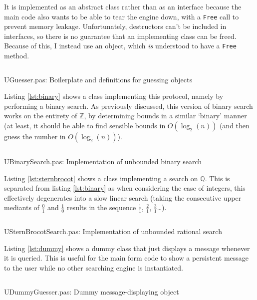 \documentclass[a4paper,11pt]{article}
\newenvironment{longlisting}
{\addvspace{\baselineskip}\captionsetup{type=listing}}
{\addvspace{\baselineskip}}
\begin{document}
    It is implemented as an abstract class rather than as an interface because
    the main code also wants to be able to tear the engine down, with a
    \texttt{Free} call to prevent memory leakage. Unfortunately, destructors
    can't be included in interfaces, so there is no guarantee that an
    implementing class can be freed. Because of this, I instead use an object,
    which \textit{is} understood to have a \texttt{Free} method.

\begin{longlisting}
\inputminted{Pascal}{../UGuesser.pas}
\caption{UGuesser.pas: Boilerplate and definitions for guessing objects}
\label{lst:guesser}
\end{longlisting}

    Listing \ref{lst:binary} shows a class implementing this protocol, namely by
    performing a binary search. As previously discussed, this version of binary
    search works on the entirety of $\mathbb{Z}$, by determining bounds in a
    similar `binary' manner (at least, it should be able to find sensible bounds
    in $O(\log_2(n))$ (and then guess the number in $O(\log_2(n))$).

\begin{longlisting}
\inputminted{Pascal}{../UBinarySearch.pas}
\caption{UBinarySearch.pas: Implementation of unbounded binary search}
\label{lst:binary}
\end{longlisting}

    Listing \ref{lst:sternbrocot} shows a class implementing a search on
    $\mathbb{Q}$. This is separated from listing \ref{lst:binary} as when
    considering the case of integers, this effectively degenerates into a slow
    linear search (taking the consecutive upper mediants of $\frac{0}{1}$ and
    $\frac{1}{0}$ results in the sequence $\frac{1}{1}$, $\frac{2}{1}$,
    $\frac{3}{1}$\ldots).

\begin{longlisting}
\inputminted{Pascal}{../USternBrocotSearch.pas}
\caption{USternBrocotSearch.pas: Implementation of unbounded rational search}
\label{lst:sternbrocot}
\end{longlisting}

    Listing \ref{lst:dummy} shows a dummy class that just displays a message
    whenever it is queried. This is useful for the main form code to show a
    persistent message to the user while no other searching engine is
    instantiated.

\begin{longlisting}
\inputminted{Pascal}{../UDummyGuesser.pas}
\caption{UDummyGuesser.pas: Dummy message-displaying object}
\label{lst:dummy}
\end{longlisting}
\end{document}
